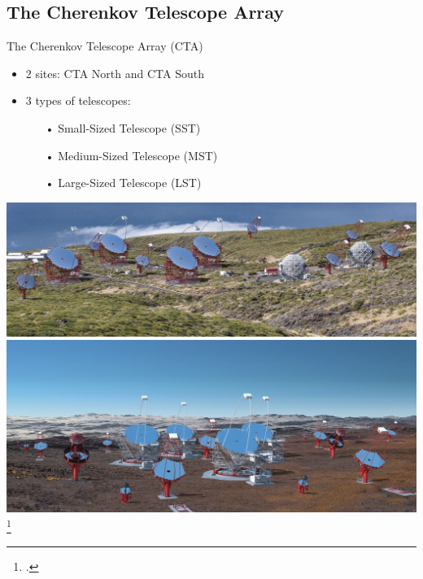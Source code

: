 \subsection{The Cherenkov Telescope Array}

\begin{frame}{The Cherenkov Telescope Array (CTA)}
  \begin{minipage}{0.48\textwidth}
    \begin{itemize}
      \setlength\itemsep{1em}
      \item 2 sites: CTA North and CTA South
      \item 3 types of telescopes:
      \begin{itemize}
        \setlength\itemsep{0.5em}
        \item [•] Small-Sized Telescope (SST)
        \item [•] Medium-Sized Telescope (MST)
        \item [•] Large-Sized Telescope (LST)
      \end{itemize}
    \end{itemize}
  \end{minipage}
  \begin{minipage}{0.48\textwidth}
    \begin{center}
      \includegraphics[width=\textwidth]{graphics/cta_north_render.jpg}
      \includegraphics[width=\textwidth]{graphics/cta_south_render.jpg}
      \footcite{perezdiaz}
    \end{center}
  \end{minipage}
\end{frame}


